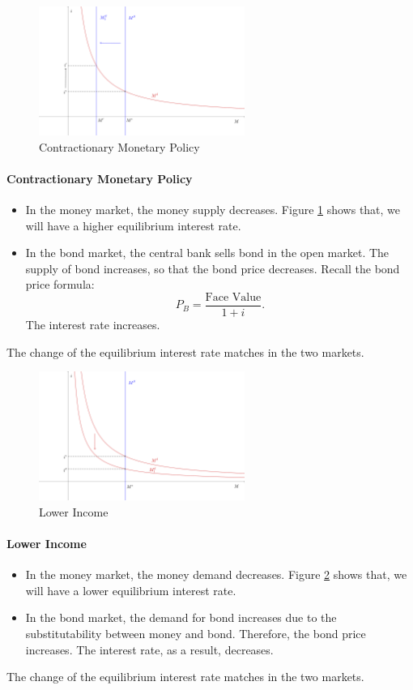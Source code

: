 \documentclass[12pt]{article}
\begin{document}
\begin{figure}[htp]
    \centering
    \includegraphics[width=0.6\textwidth]{money_eqm_02.png}
    \caption{Contractionary Monetary Policy}
    \label{fig:money_eqm_02}
\end{figure}

\paragraph{Contractionary Monetary Policy}
\begin{itemize}
	\item In the money market, the money supply decreases. Figure \ref{fig:money_eqm_02} shows that, we will have a higher equilibrium interest rate.
	\item In the bond market, the central bank sells bond in the open market. The supply of bond increases, so that the bond price decreases. Recall the bond price formula:
	\[P_B = \frac{\text{Face Value}}{1 + i}.\]
	The interest rate increases.
\end{itemize}
The change of the equilibrium interest rate matches in the two markets.\\


\begin{figure}[htp]
    \centering
    \includegraphics[width=0.6\textwidth]{money_eqm_03.png}
    \caption{Lower Income}
    \label{fig:money_eqm_03}
\end{figure}

\paragraph{Lower Income}
\begin{itemize}
	\item In the money market, the money demand decreases. Figure \ref{fig:money_eqm_03} shows that, we will have a lower equilibrium interest rate.
	\item In the bond market, the demand for bond increases due to the substitutability between money and bond. Therefore, the bond price increases. The interest rate, as a result, decreases. 
\end{itemize}
The change of the equilibrium interest rate matches in the two markets.
\end{document}
